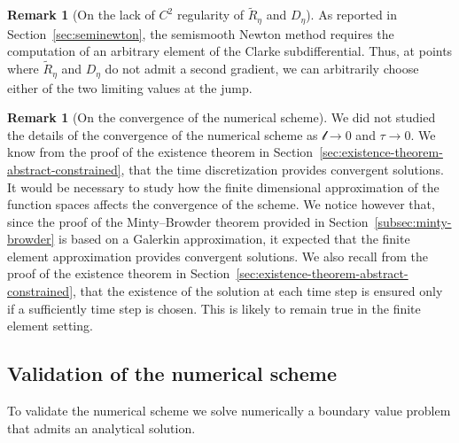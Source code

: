 \documentclass[a4paper,10pt,oneside]{amsbook}
\numberwithin{section}{chapter}
\numberwithin{equation}{chapter}
\theoremstyle{definition}
\newtheorem{rmk}[prop]{Remark}
\begin{document}
\begin{rmk}[On the lack of $C^2$ regularity of $\tilde R_\eta$ and $D_\eta$]
As reported in Section~\ref{sec:seminewton}, the semismooth Newton method requires the computation of an arbitrary element of the Clarke subdifferential. Thus, at points where $\tilde R_\eta $ and $D_\eta$ do not admit a second gradient, we can arbitrarily choose either of the two limiting values at the jump.
\end{rmk}
\begin{rmk}[On the convergence of the numerical scheme]
We did not studied the details of the convergence of the numerical scheme as $\mathscr{l}\to0$ and $\tau\to0$. We know from the proof of the existence theorem in Section~\ref{sec:existence-theorem-abstract-constrained}, that the time discretization provides convergent solutions. It would be necessary to study how the finite dimensional approximation of the function spaces affects the convergence of the scheme. We notice however that, since the proof of the Minty--Browder theorem provided in Section~\ref{subsec:minty-browder} is based on a Galerkin approximation, it expected that the finite element approximation provides convergent solutions. We also recall from the proof of the existence theorem in Section~\ref{sec:existence-theorem-abstract-constrained}, that the existence of the solution at each time step is ensured only if a sufficiently time step is chosen. This is likely to remain true in the finite element setting.
\end{rmk}

\subsection{Validation of the numerical scheme}

To validate the numerical scheme we solve numerically a boundary value problem that admits an analytical solution.
\end{document}
